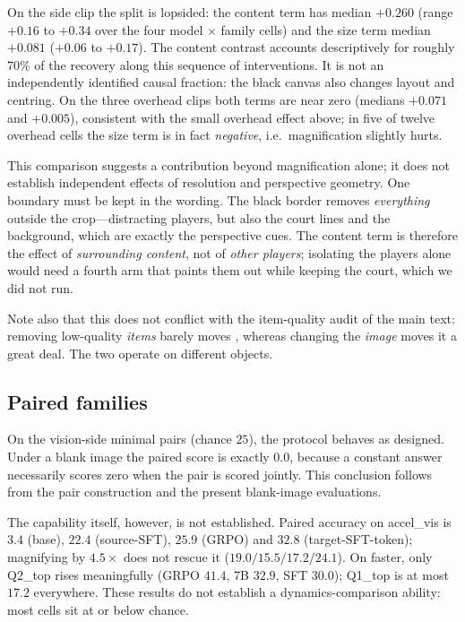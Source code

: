 On the side clip the split is lopsided: the content term has median $+0.260$
(range $+0.16$ to $+0.34$ over the four model $\times$ family cells) and the
size term median $+0.081$ ($+0.06$ to $+0.17$). The content contrast accounts descriptively for roughly $70\%$ of the
recovery along this sequence of interventions. It is not an independently
identified causal fraction: the black canvas also changes layout and centring. On the three overhead clips both terms are near zero (medians
$+0.071$ and $+0.005$), consistent with the small overhead effect above; in
five of twelve overhead cells the size term is in fact \emph{negative}, i.e.\
magnification slightly hurts.

This comparison suggests a contribution beyond magnification alone;
it does not establish independent effects of resolution and perspective geometry. One boundary must be kept in the wording. The
black border removes \emph{everything} outside the crop---distracting players,
but also the court lines and the background, which are exactly the perspective
cues. The content term is therefore the effect of \emph{surrounding content},
not of \emph{other players}; isolating the players alone would need a fourth arm
that paints them out while keeping the court, which we did not run.

Note also that this does not conflict with the item-quality audit of
the main text: removing low-quality \emph{items} barely moves
\rhosp{}, whereas changing the \emph{image} moves it a great deal. The two
operate on different objects.

\subsection{Paired families}
\label{sec:paired}

On the vision-side minimal pairs (chance $25$), the protocol behaves as
designed. Under a blank image the paired score is exactly $0.0$, because a constant answer necessarily scores zero when the pair is scored
jointly. This conclusion follows from the pair construction and the present
blank-image evaluations.

The capability itself, however, is not established. Paired accuracy on
accel\_vis is $3.4$ (base), $22.4$ (source-SFT), $25.9$ (GRPO) and $32.8$
(target-SFT-token); magnifying by $4.5\times$ does not rescue it
($19.0 / 15.5 / 17.2 / 24.1$). On faster, only Q2\_top rises meaningfully
(GRPO $41.4$, 7B $32.9$, SFT $30.0$); Q1\_top is at most $17.2$ everywhere.
These results do not establish a dynamics-comparison ability: most cells sit
at or below chance.

